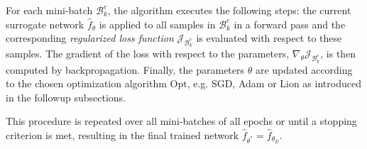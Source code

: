 For each mini-batch $\mathcal{B}^e_k$, the algorithm executes the following
steps: the current surrogate network $\hat{f}_{\theta}$ is applied to all
samples in $\mathcal{B}^e_k$ in a forward pass and the corresponding
\emph{regularized loss function} $\mathcal{J}_{\mathcal{B}_k^e}$ is evaluated
with respect to these samples. The gradient of the loss with respect to the
parameters, $\nabla_\theta \mathcal{J}_{\mathcal{B}_k^e}$, is then computed by
backpropagation. Finally, the parameters $\theta$ are updated according to the
chosen optimization algorithm $\mathrm{Opt}$, e.g. SGD, Adam or Lion as
introduced in the followup subsections.

This procedure is repeated over all mini-batches of all epochs or until a
stopping criterion is met, resulting in the final trained network
$\hat{f}_{\theta^*} = \hat{f}_{\theta_E}$.

